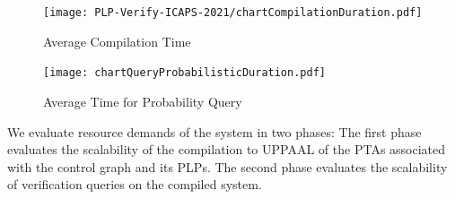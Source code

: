 \documentclass[letterpaper]{article}
\begin{document}
\begin{figure}[h]
\centering
 \texttt{[image: PLP-Verify-ICAPS-2021/chartCompilationDuration.pdf]}  
 \vspace{-0.35in}
\caption{Average Compilation Time}
\label{fig:compilation-time}
\end{figure}

\begin{figure}[htb!]
  \centering
  \texttt{[image: chartQueryProbabilisticDuration.pdf]}  
  \vspace{-0.17in}
  \caption{Average Time for Probability Query}
  \label{fig:time-prob-query}
\end{figure}


We evaluate resource demands of the system 
in two phases: The first phase evaluates 
the scalability of the compilation to UPPAAL of the  PTAs associated
with the control graph and its PLPs.
The second phase evaluates the scalability of 
verification queries on the
compiled system.
\end{document}
